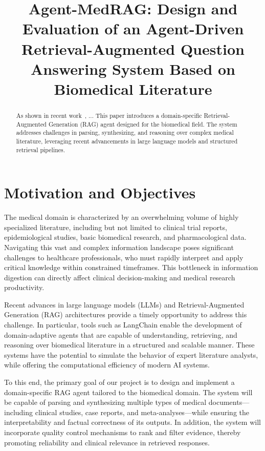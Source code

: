 \documentclass[conference]{IEEEtran}
\title{Agent-MedRAG: Design and Evaluation of an Agent-Driven Retrieval-Augmented Question Answering System Based on Biomedical Literature}
\author{
  \IEEEauthorblockN{Xinglan Zhao \& Chuyang Su}
  \IEEEauthorblockA{
    Columbia University\\
    New York, NY, USA\\
    \texttt{xz3420@columbia.edu & cs4570@columbia.edu}
    \texttt{GitHub Link: https://github.com/skylarzhao1/GR5293-AgentMedRag}
  }
}
\begin{document}
\maketitle
\begin{abstract}
    As shown in recent work~\cite{ragas2023}, ...
This paper introduces a domain-specific Retrieval-Augmented Generation (RAG) agent designed for the biomedical field. The system addresses challenges in parsing, synthesizing, and reasoning over complex medical literature, leveraging recent advancements in large language models and structured retrieval pipelines.
\end{abstract}

\section{Motivation and Objectives}

The medical domain is characterized by an overwhelming volume of highly specialized literature, including but not limited to clinical trial reports, epidemiological studies, basic biomedical research, and pharmacological data. Navigating this vast and complex information landscape poses significant challenges to healthcare professionals, who must rapidly interpret and apply critical knowledge within constrained timeframes. This bottleneck in information digestion can directly affect clinical decision-making and medical research productivity.

Recent advances in large language models (LLMs) and Retrieval-Augmented Generation (RAG) architectures provide a timely opportunity to address this challenge. In particular, tools such as LangChain enable the development of domain-adaptive agents that are capable of understanding, retrieving, and reasoning over biomedical literature in a structured and scalable manner. These systems have the potential to simulate the behavior of expert literature analysts, while offering the computational efficiency of modern AI systems.

To this end, the primary goal of our project is to design and implement a domain-specific RAG agent tailored to the biomedical domain. The system will be capable of parsing and synthesizing multiple types of medical documents---including clinical studies, case reports, and meta-analyses---while ensuring the interpretability and factual correctness of its outputs. In addition, the system will incorporate quality control mechanisms to rank and filter evidence, thereby promoting reliability and clinical relevance in retrieved responses.
\end{document}
